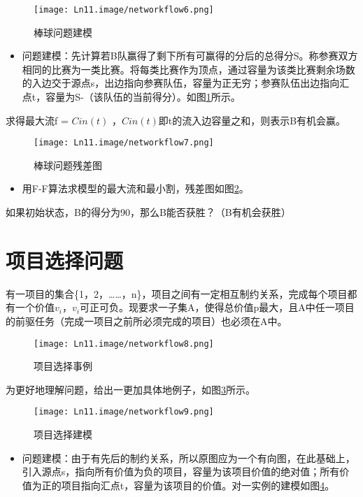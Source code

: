 \begin{figure}[h]
  \centering
  \texttt{[image: Ln11.image/networkflow6.png]}
  \caption{棒球问题建模}\label{fig6}
\end{figure}

\begin{itemize}
  \item 问题建模：先计算若B队赢得了剩下所有可赢得的分后的总得分S。称参赛双方相同的比赛为一类比赛。将每类比赛作为顶点，通过容量为该类比赛剩余场数的入边交于源点s，出边指向参赛队伍，容量为正无穷；参赛队伍出边指向汇点t，容量为S-（该队伍的当前得分）。如图\ref{fig6}所示。
\end{itemize}

求得最大流f = \(Cin(t)\) ，\(Cin(t)\)即t的流入边容量之和，则表示B有机会赢。

\begin{figure}[htb]
  \centering
  \texttt{[image: Ln11.image/networkflow7.png]}
  \caption{棒球问题残差图}\label{fig7}
\end{figure}

\begin{itemize}
  \item 用F-F算法求模型的最大流和最小割，残差图如图\ref{fig7}。
\end{itemize}
\begin{example}
如果初始状态，B的得分为90，那么B能否获胜？（B有机会获胜）
\end{example}

\section{项目选择问题}
\begin{example}
有一项目的集合\{1，2，……，n\}，项目之间有一定相互制约关系，完成每个项目都有一个价值\(v_i\)，\(v_i\)可正可负。现要求一子集A，使得总价值p最大，且A中任一项目的前驱任务（完成一项目之前所必须完成的项目）也必须在A中。
\end{example}

\begin{figure}[htb]
  \centering
  \texttt{[image: Ln11.image/networkflow8.png]}
  \caption{项目选择事例}\label{fig8}
\end{figure}
为更好地理解问题，给出一更加具体地例子，如图\ref{fig8}所示。
\begin{figure}[htb]
  \centering
  \texttt{[image: Ln11.image/networkflow9.png]}
  \caption{项目选择建模}\label{fig9}
\end{figure}
\begin{itemize}
  \item 问题建模：由于有先后的制约关系，所以原图应为一个有向图，在此基础上，引入源点s，指向所有价值为负的项目，容量为该项目价值的绝对值；所有价值为正的项目指向汇点t，容量为该项目的价值。对一实例的建模如图\ref{fig9}。
\end{itemize}

